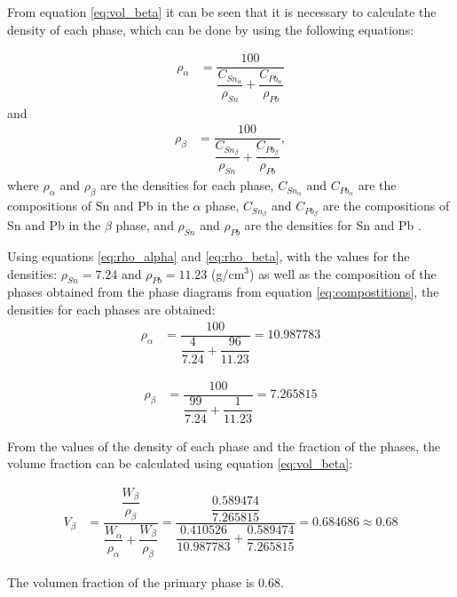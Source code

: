 From equation \eqref{eq:vol_beta} it can be seen that it is necessary to calculate the density of each phase, which can be done by using the following equations:

\begin{align}
    \label{eq:rho_alpha}
    \rho_{\alpha}&=\dfrac{100}{\dfrac{C_{Sn_{\alpha}}}{\rho_{Sn}}+\dfrac{C_{Pb_{\alpha}}}{\rho_{Pb}}}
\end{align}
and
\begin{align}
    \label{eq:rho_beta}
    \rho_{\beta}&=\dfrac{100}{\dfrac{C_{Sn_{\beta}}}{\rho_{Sn}}+\dfrac{C_{Pb_{\beta}}}{\rho_{Pb}}},
\end{align}
where $\rho_{\alpha}$ and $\rho_{\beta}$ are the densities for each phase, $C_{Sn_{\alpha}}$ and $C_{Pb_{\alpha}}$ are the compositions of Sn and Pb in the $\alpha$ phase, $C_{Sn_{\beta}}$ and $C_{Pb_{\beta}}$ are the compositions of Sn and Pb in the $\beta$ phase, and $\rho_{Sn}$ and $\rho_{Pb}$ are the densities for Sn and Pb \citep[p.~97]{callister2010materials}.

Using equations \eqref{eq:rho_alpha} and \eqref{eq:rho_beta}, with the values for the densities: $\rho_{Sn}=7.24$ and $\rho_{Pb}=11.23$ (g/cm$^3$) \citep[p.~302]{callister2010materials} as well as the composition of the phases obtained from the phase diagrams from equation \ref{eq:compostitions}, the densities for each phases are obtained:
\begin{align}
    \label{eq:rho_alpha_num}
    \rho_{\alpha}&=\dfrac{100}{\dfrac{4}{7.24}+\dfrac{96}{11.23}}=10.987783
\end{align}

\begin{align}
    \label{eq:rho_beta_num}
    \rho_{\beta}&=\dfrac{100}{\dfrac{99}{7.24}+\dfrac{1}{11.23}}=7.265815
\end{align}

\newpage
From the values of the density of each phase and the fraction of the phases, the volume fraction can be calculated using equation \eqref{eq:vol_beta}:

\begin{align}
    \label{eq:vol_beta_num}
    V_{\beta}&=\dfrac{\dfrac{W_{\beta}}{\rho_{\beta}}}{\dfrac{W_{\alpha}}{\rho_{\alpha}}+\dfrac{W_{\beta}}{\rho_{\beta}}}=\dfrac{\dfrac{0.589474}{7.265815}}{\dfrac{0.410526}{10.987783}+\dfrac{0.589474}{7.265815}}=0.684686\approx 0.68
\end{align}

\begin{mdframed}
The volumen fraction of the primary phase is 0.68.
\end{mdframed}


